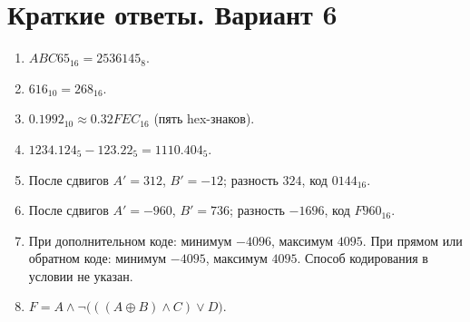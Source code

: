\section*{Краткие ответы. Вариант 6}
\begin{enumerate}
    \item $ABC65_{16}=2536145_8$.
    \item $616_{10}=268_{16}$.
    \item $0.1992_{10}\approx0.32FEC_{16}$ (пять hex-знаков).
    \item $1234.124_5-123.22_5=1110.404_5$.
    \item После сдвигов $A'=312$, $B'=-12$; разность $324$, код $0144_{16}$.
    \item После сдвигов $A'=-960$, $B'=736$; разность $-1696$, код $F960_{16}$.
    \item При дополнительном коде: минимум $-4096$, максимум $4095$. При прямом или обратном коде: минимум $-4095$, максимум $4095$. Способ кодирования в условии не указан.
    \item $F=A\land\lnot\bigl(((A\oplus B)\land C)\lor D\bigr)$.
\end{enumerate}

